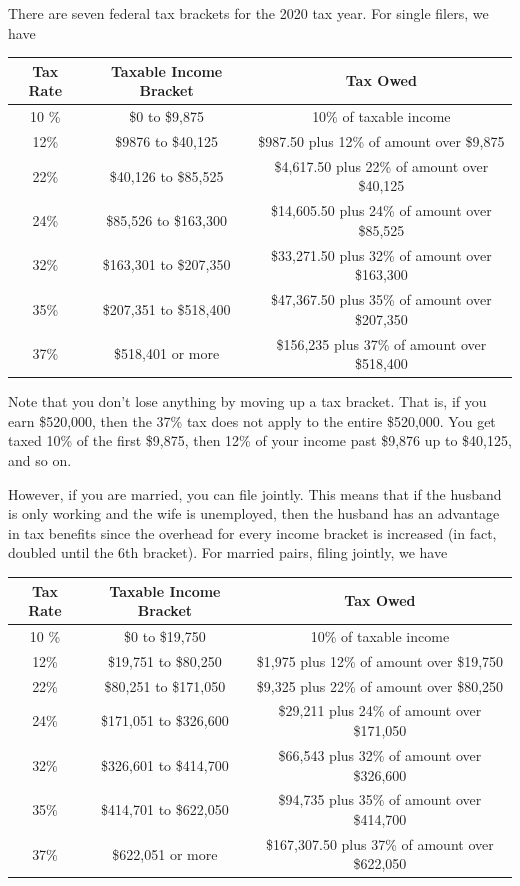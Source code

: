 \documentclass{article}
\begin{document}
  \begin{example}
    There are seven federal tax brackets for the 2020 tax year. For single filers, we have
    \begin{center}
    \begin{tabular}{c|c|c}
      Tax Rate & Taxable Income Bracket & Tax Owed \\
      \hline
      10 \% & \$0 to \$9,875 & 10\% of taxable income \\
      12\% & \$9876 to \$40,125 & \$987.50 plus 12\% of amount over \$9,875\\
      22\% & \$40,126 to \$85,525 & \$4,617.50 plus 22\% of amount over \$40,125\\
      24\% & \$85,526 to \$163,300 & \$14,605.50 plus 24\% of amount over \$85,525\\
      32\% & \$163,301 to \$207,350 & \$33,271.50 plus 32\% of amount over \$163,300\\
      35\% & \$207,351 to \$518,400 & \$47,367.50 plus 35\% of amount over \$207,350\\
      37\% & \$518,401 or more & \$156,235 plus 37\% of amount over \$518,400
    \end{tabular}
    \end{center}
    Note that you don't lose anything by moving up a tax bracket. That is, if you earn \$520,000, then the 37\% tax does not apply to the entire \$520,000. You get taxed 10\% of the first \$9,875, then 12\% of your income past \$9,876 up to \$40,125, and so on. 

    However, if you are married, you can file jointly. This means that if the husband is only working and the wife is unemployed, then the husband has an advantage in tax benefits since the overhead for every income bracket is increased (in fact, doubled until the 6th bracket). For married pairs, filing jointly, we have 
    \begin{center}
    \begin{tabular}{c|c|c}
      Tax Rate & Taxable Income Bracket & Tax Owed \\
      \hline
      10 \% & \$0 to \$19,750 & 10\% of taxable income \\
      12\% & \$19,751 to \$80,250 & \$1,975 plus 12\% of amount over \$19,750\\
      22\% & \$80,251 to \$171,050 & \$9,325 plus 22\% of amount over \$80,250\\
      24\% & \$171,051 to \$326,600 & \$29,211 plus 24\% of amount over \$171,050\\
      32\% & \$326,601 to \$414,700 & \$66,543 plus 32\% of amount over \$326,600\\
      35\% & \$414,701 to \$622,050 & \$94,735 plus 35\% of amount over \$414,700\\
      37\% & \$622,051 or more & \$167,307.50 plus 37\% of amount over \$622,050
    \end{tabular}
    \end{center}
  \end{example}
\end{document}
